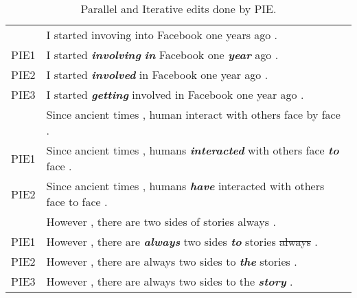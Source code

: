 \documentclass[11pt,a4paper]{article}
\begin{document}
\begin{table}[h]
\begin{small}
    \centering
    \begin{tabular}{|l|p{62mm}|} \hline

 & I started invoving into Facebook one years ago .\\
PIE1 & I started {\color{red}\textbf{\textit{involving}}} {\color{red}\textbf{\textit{in}}} Facebook one {\color{red}\textbf{\textit{year}}} ago .\\
PIE2 & I started {\color{red}\textbf{\textit{involved}}} in Facebook one year ago .\\
PIE3 & I started {\color{red}\textbf{\textit{getting}}} involved in Facebook one year ago .\\ \hline
 & Since ancient times , human interact with others face by face .\\
PIE1 & Since ancient times , humans {\color{red}\textbf{\textit{interacted}}} with others face {\color{red}\textbf{\textit{to}}} face .\\
PIE2 & Since ancient times , humans {\color{red}\textbf{\textit{have}}} interacted with others face to face .\\ \hline
 & However , there are two sides of stories always .\\
PIE1 & However , there are {\color{red}\textbf{\textit{always}}} two sides {\color{red}\textbf{\textit{to}}} stories {\color{red}\st{always}} .\\
PIE2 & However , there are always two sides to {\color{red}\textbf{\textit{the}}} stories .\\
PIE3 & However , there are always two sides to the {\color{red}\textbf{\textit{story}}} .\\ \hline
    \end{tabular}
    \end{small}
    \caption{Parallel and Iterative edits done by PIE.}
    \label{tab:gec}
\end{table}{}
\end{document}
